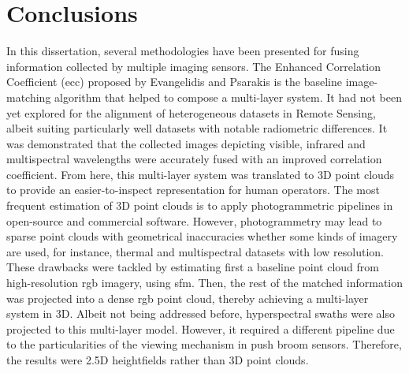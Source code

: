 \setchapterpreamble[u]{\margintoc}
\chapter{Conclusions}
\label{sec:conclusions}

In this dissertation, several methodologies have been presented for fusing information collected by multiple imaging sensors. The Enhanced Correlation Coefficient (\acrshort{ecc}) proposed by Evangelidis and Psarakis \cite{evangelidis_parametric_2008} is the baseline image-matching algorithm that helped to compose a multi-layer system. It had not been yet explored for the alignment of heterogeneous datasets in Remote Sensing, albeit suiting particularly well datasets with notable radiometric differences. It was demonstrated that the collected images depicting visible, infrared and multispectral wavelengths were accurately fused with an improved correlation coefficient. From here, this multi-layer system was translated to 3D point clouds to provide an easier-to-inspect representation for human operators. The most frequent estimation of 3D point clouds is to apply photogrammetric pipelines in open-source and commercial software. However, photogrammetry may lead to sparse point clouds with geometrical inaccuracies whether some kinds of imagery are used, for instance, thermal and multispectral datasets with low resolution. These drawbacks were tackled by estimating first a baseline point cloud from high-resolution \acrshort{rgb} imagery, using \acrshort{sfm}. Then, the rest of the matched information was projected into a dense \acrshort{rgb} point cloud, thereby achieving a multi-layer system in 3D. Albeit not being addressed before, hyperspectral swaths were also projected to this multi-layer model. However, it required a different pipeline due to the particularities of the viewing mechanism in push broom sensors. Therefore, the results were 2.5D heightfields rather than 3D point clouds. 

